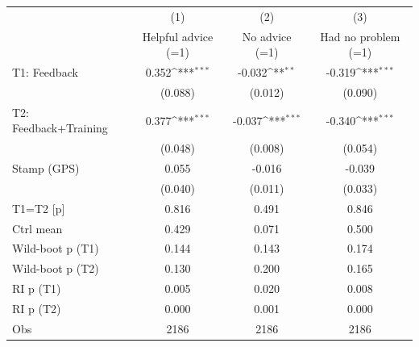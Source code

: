 {
\def\sym#1{\ifmmode^{#1}\else\(^{#1}\)\fi}
\begin{tabular}{l*{3}{c}}
\toprule
                    &\multicolumn{1}{c}{(1)}&\multicolumn{1}{c}{(2)}&\multicolumn{1}{c}{(3)}\\
                    &\multicolumn{1}{c}{Helpful advice (=1)}&\multicolumn{1}{c}{No advice (=1)}&\multicolumn{1}{c}{Had no problem (=1)}\\
\midrule
T1: Feedback        &       0.352\sym{***}&      -0.032\sym{**} &      -0.319\sym{***}\\
                    &     (0.088)         &     (0.012)         &     (0.090)         \\
T2: Feedback+Training&       0.377\sym{***}&      -0.037\sym{***}&      -0.340\sym{***}\\
                    &     (0.048)         &     (0.008)         &     (0.054)         \\
Stamp (GPS)         &       0.055         &      -0.016         &      -0.039         \\
                    &     (0.040)         &     (0.011)         &     (0.033)         \\
\midrule
T1=T2 [p]           &       0.816         &       0.491         &       0.846         \\
Ctrl mean           &       0.429         &       0.071         &       0.500         \\
Wild-boot p (T1)    &       0.144         &       0.143         &       0.174         \\
Wild-boot p (T2)    &       0.130         &       0.200         &       0.165         \\
RI p (T1)           &       0.005         &       0.020         &       0.008         \\
RI p (T2)           &       0.000         &       0.001         &       0.000         \\
Obs                 &        2186         &        2186         &        2186         \\
\bottomrule
\end{tabular}
}
